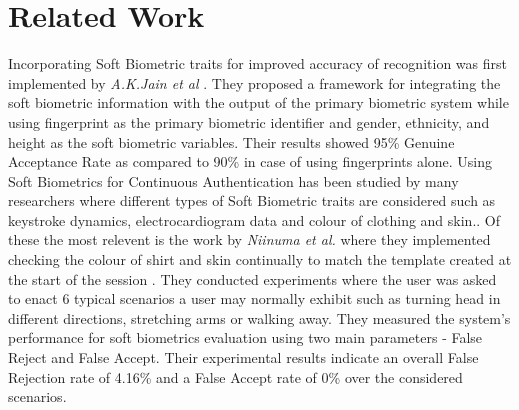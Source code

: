 \documentclass[%
        submission,
        notitlepage,
        narroweqnarray,
        inline,
        ]{ieee}
\begin{document}
\section{Related Work}
Incorporating Soft Biometric traits for improved accuracy of recognition was first implemented by \emph{A.K.Jain et al} \cite{Jain204}. They proposed a framework for integrating the soft biometric information with the output of the primary biometric system while using fingerprint as the primary biometric identifier and gender, ethnicity, and height as the soft biometric variables. Their results showed 95\% Genuine Acceptance Rate as compared to 90\% in case of using fingerprints alone. 
Using Soft Biometrics for Continuous Authentication has been studied by many researchers where different types of Soft Biometric traits are considered such as keystroke dynamics, electrocardiogram data and colour of clothing and skin.\cite{mon00,ecd,Niin10}. Of these the most relevent is the work by \emph{Niinuma et al.} where they implemented checking the colour of shirt and skin continually to match the template created at the start of the session \cite{Niin10}. They conducted experiments where the user was asked to enact 6 typical scenarios a user may normally exhibit such as turning head in different directions, stretching arms or walking away. They measured the system's performance for soft biometrics evaluation using two main parameters - False Reject and False Accept. Their experimental results indicate an overall False Rejection rate of 4.16\% and a False Accept rate of 0\% over the considered scenarios.


\end{document}
